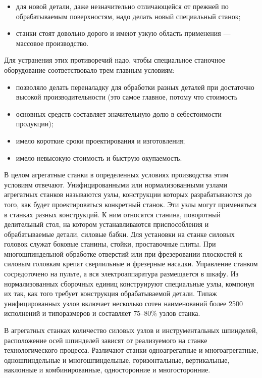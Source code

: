 \begin{itemize}
	\item для новой детали, даже незначительно отличающейся от прежней по обрабатываемым поверхностям, надо делать новый специальный станок;
	\item станки стоят довольно дорого и имеют узкую область применения — массовое производство.
\end{itemize}

Для устранения этих противоречий надо, чтобы специальное станочное оборудование соответствовало трем главным условиям:

\begin{itemize}
	\item позволяло делать переналадку для обработки разных деталей при достаточно высокой производительности (это самое главное, потому что стоимость
	\item основных средств составляет значительную долю в себестоимости продукции);
	\item имело короткие сроки проектирования и изготовления;
	\item имело невысокую стоимость и быструю окупаемость.
\end{itemize}

В целом агрегатные станки в определенных условиях производства этим условиям отвечают. Унифицированными или нормализованными узлами агрегатных станков называются узлы, конструкции которых разрабатываются до того, как будет проектироваться конкретный станок. Эти узлы могут применяться в станках разных конструкций. К ним относятся станина, поворотный делительный стол, на котором устанавливаются приспособления и обрабатываемые детали, силовые бабки. Для установки на станке силовых головок служат боковые станины, стойки, проставочные плиты. При многошпиндельной обработке отверстий или при фрезеровании плоскостей к силовым головкам крепят сверлильные и фрезерные насадки. Управление станком сосредоточено на пульте, а вся электроаппаратура размещается в шкафу. Из нормализованных сборочных единиц конструируют специальные узлы, компонуя их так, как того требует конструкция обрабатываемой детали. Типаж унифицированных узлов включает несколько сотен наименований более 2500 исполнений и типоразмеров и составляет 75--80\% узлов станка.

В агрегатных станках количество силовых узлов и инструментальных шпинделей, расположение осей шпинделей зависят от реализуемого на станке технологического процесса. Различают станки одноагрегатные и многоагрегатные, одношпиндельные и многошпиндельные, горизонтальные, вертикальные, наклонные и комбинированные, односторонние и многосторонние.

